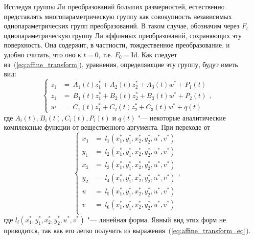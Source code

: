 \documentclass[../main.tex]{subfiles}
\begin{document}
Исследуя группы Ли преобразований больших размерностей, естественно представлять многопараметрическую группу как совокупность независимых однопараметрических групп преобразований. В таком случае, обозначим через $F_t$ однопараметрическую группу Ли аффинных преобразований, сохраняющих эту поверхность. Она содержит, в частности, тождественное преобразование, и удобно считать, что оно  к $t = 0$, т.е. $F_0 = \textrm{Id}$. Как следует из~(\ref{eq:affine_transform}), уравнения, определяющие эту группу, будут иметь вид:
\begin{equation}\label{eq:affine_transform_eq}
  \begin{cases}
     z_1 &=~A_{1}(t) z_1^* + A_{2}(t) z_2^* + A_{3}(t) w^* + P_1(t) \\
     z_1 &=~B_{1}(t) z_1^* + B_{2}(t) z_2^* + B_{3}(t) w^* + P_2(t) \\
     w   &=~C_{1}(t) z_1^* + C_{2}(t) z_2^* + C_{3}(t) w^* + q(t)
  \end{cases},
\end{equation}
где $A_{i}(t), B_{i}(t), C_{i}(t), P_i(t)$ и $q(t)$ "--- некоторые аналитические комплексные функции от вещественного аргумента. При переходе от 
\begin{equation}\label{eq:coordinates_transform}
  \begin{cases}
     x_1 &=~l_1(x_1^*, y_1^*, x_2^*, y_2^*, u^*, v^*)\\
     y_1 &=~l_2(x_1^*, y_1^*, x_2^*, y_2^*, u^*, v^*)\\
     x_2 &=~l_3(x_1^*, y_1^*, x_2^*, y_2^*, u^*, v^*)\\
     y_2 &=~l_4(x_1^*, y_1^*, x_2^*, y_2^*, u^*, v^*)\\
     u   &=~l_5(x_1^*, y_1^*, x_2^*, y_2^*, u^*, v^*)\\
     v   &=~l_6(x_1^*, y_1^*, x_2^*, y_2^*, u^*, v^*)\\
  \end{cases},
\end{equation}
где $l_i(x_1^*, y_1^*, x_2^*, y_2^*, u^*, v^*)$ "--- линейная форма. Явный вид этих форм не приводится, так как его легко получить из выражения~(\ref{eq:affine_transform_eq}).
\end{document}
